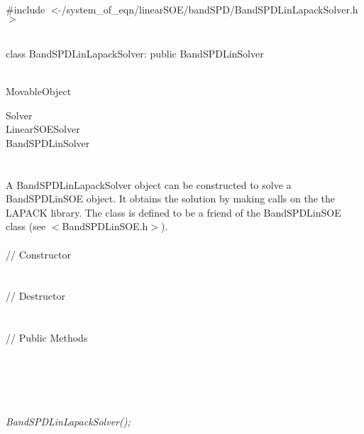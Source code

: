 
   \\
\#include $<\tilde{ }$/system\_of\_eqn/linearSOE/bandSPD/BandSPDLinLapackSolver.h$>$  


  \\
class BandSPDLinLapackSolver: public BandSPDLinSolver  


 \\
MovableObject 

\indent\indent  Solver \\
\indent\indent\indent LinearSOESolver \\
\indent\indent\indent\indent BandSPDLinSolver \\
\indent\indent\indent\indent{} \\

  \\
\indent A BandSPDLinLapackSolver object can be constructed to solve
a BandSPDLinSOE object. It obtains the solution by making calls on the
the LAPACK library. The class is defined to be a friend of the 
BandSPDLinSOE class (see $<$BandSPDLinSOE.h$>$). \\


  \\
\indent\indent // Constructor \\
\indent{}  \\ \\
\indent\indent // Destructor \\
\indent{}\\  \\
\indent\indent // Public Methods \\
\indent{} \\
\indent{} \\
\indent{}\\ 
\indent{}\\ 


  \\
{\em BandSPDLinLapackSolver();}  

